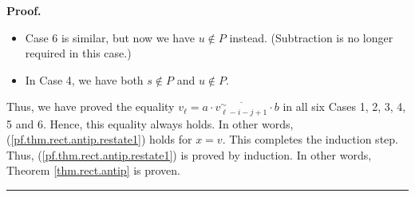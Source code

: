 \documentclass[numbers=enddot,12pt,final,onecolumn,notitlepage]{scrartcl}%
\theoremstyle{definition}
\newenvironment{vershort}{}{}
\newenvironment{proof}[1][Proof]{\noindent\textbf{#1.} }{\ \rule{0.5em}{0.5em}}
\begin{document}
\begin{vershort}
\begin{proof}
\begin{itemize}
\item Case 6 is similar, but now we have $u\notin P$ instead. (Subtraction is
no longer required in this case.)

\item In Case 4, we have both $s\notin P$ and $u\notin P$.
\end{itemize}

Thus, we have proved the equality $v_{\ell}=a\cdot\overline{v_{\ell
-i-j+1}^{\sim}}\cdot b$ in all six Cases 1, 2, 3, 4, 5 and 6. Hence, this
equality always holds. In other words, (\ref{pf.thm.rect.antip.restate1})
holds for $x=v$. This completes the induction step. Thus,
(\ref{pf.thm.rect.antip.restate1}) is proved by induction. In other words,
Theorem \ref{thm.rect.antip} is proven.
\end{proof}
\end{vershort}
\end{document}
